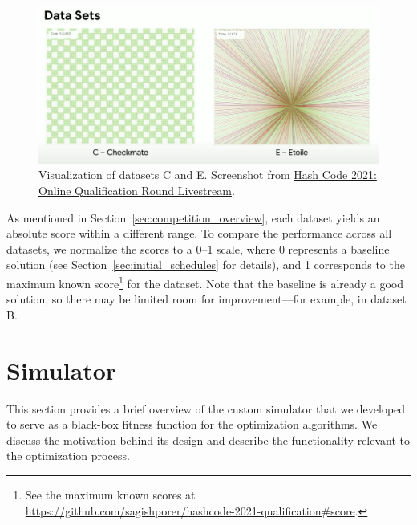 \begin{figure}[h]
    \centering
    \includegraphics[width=\linewidth]{img/screenshots/hashcode_datasets_c_e.png}
    \caption[Visualization of datasets C and E]{
        Visualization of datasets C and E. Screenshot from \href{https://www.youtube.com/watch?v=YPOVd-hQUjA}{Hash Code 2021: Online Qualification Round Livestream}.
    }
    \label{fig:hashcode_dataset_c_e}
    \end{figure}

As mentioned in Section~\ref{sec:competition_overview}, each dataset yields an absolute score within a different range. To compare the performance across all datasets, we normalize the scores to a 0--1 scale, where 0 represents a baseline solution (see Section~\ref{sec:initial_schedules} for details), and 1 corresponds to the maximum known score\footnote{See the maximum known scores at \\\url{https://github.com/sagishporer/hashcode-2021-qualification\#score}.} for the dataset. Note that the baseline is already a good solution, so there may be limited room for improvement---for example, in dataset B.

\section{Simulator} \label{sec:simulator}

This section provides a brief overview of the custom simulator that we developed to serve as a black-box fitness function for the optimization algorithms. We discuss the motivation behind its design and describe the functionality relevant to the optimization process.

\bigskip

